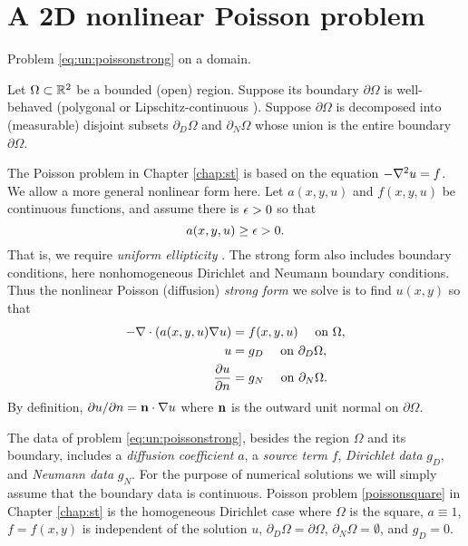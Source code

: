 \section{A 2D nonlinear Poisson problem}

\begin{marginfigure}

\caption{Problem \eqref{eq:un:poissonstrong} on a domain.}
\label{fig:un:generalpoissondomain}
\end{marginfigure}

Let $\Omega \subset \mathbb{R}^2$ be a bounded (open) region.  Suppose its boundary $\partial\Omega$ is well-behaved (polygonal or Lipschitz-continuous \citep[section 1.2]{Ciarlet2002}).  Suppose $\partial\Omega$ is decomposed into (measurable) disjoint subsets $\partial_D \Omega$ and $\partial_N \Omega$ whose union is the entire boundary $\partial \Omega$.

The Poisson problem in Chapter \ref{chap:st} is based on the equation $- \nabla^2 u = f$.  We allow a more general nonlinear form here.  Let $a(x,y,u)$ and $f(x,y,u)$ be continuous functions, and assume there is $\epsilon>0$ so that
    $$a(x,y,u) \ge \epsilon > 0.$$
That is, we require \emph{uniform ellipticity} \citep{Evans2010}.  The strong form also includes boundary conditions, here nonhomogeneous Dirichlet and Neumann boundary conditions.  Thus the  nonlinear Poisson (diffusion) \emph{strong form} we solve is to find $u(x,y)$ so that
\begin{align}
- \nabla\cdot \left(a(x,y,u) \nabla u\right) &= f(x,y,u) \quad \text{ on } \Omega, \label{eq:un:poissonstrong} \\
u &= g_D \quad \text{ on } \partial_D \Omega, \notag \\
\frac{\partial u}{\partial n} &= g_N \quad \text{ on } \partial_N \Omega. \notag
\end{align}
By definition, $\partial u/\partial n = \mathbf{n} \cdot \nabla u$ where $\mathbf{n}$ is the outward unit normal on $\partial \Omega$.

The data of problem \eqref{eq:un:poissonstrong}, besides the region $\Omega$ and its boundary, includes a \emph{diffusion coefficient} $a$, a \emph{source term} $f$, \emph{Dirichlet data} $g_D$, and \emph{Neumann data} $g_N$.  For the purpose of numerical solutions we will simply assume that the boundary data is continuous.  Poisson problem \eqref{poissonsquare} in Chapter \ref{chap:st} is the homogeneous Dirichlet case where $\Omega$ is the square, $a\equiv 1$, $f=f(x,y)$ is independent of the solution $u$, $\partial_D \Omega = \partial \Omega$, $\partial_N \Omega = \emptyset$, and $g_D=0$.

